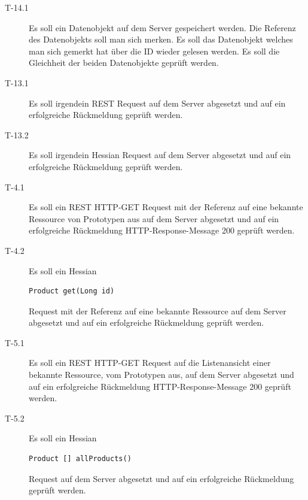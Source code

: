 \documentclass[abstracton, listof=totocnumbered,
bibliography=totocnumbered]{scrreprt}
\begin{document}
  \begin{description}

    \item[T-14.1] Es soll ein Datenobjekt auf dem Server gespeichert werden.
    Die Referenz des Datenobjekts soll man sich merken. Es soll das Datenobjekt
    welches man sich gemerkt hat über die ID wieder gelesen werden. Es soll die
    Gleichheit der beiden Datenobjekte geprüft werden.
    \newline

    \item[T-13.1] Es soll irgendein \ac{REST} Request auf dem Server abgesetzt
    und auf ein erfolgreiche Rückmeldung geprüft werden.
    \newline
    
    \item[T-13.2] Es soll irgendein Hessian Request auf dem Server abgesetzt
    und auf ein erfolgreiche Rückmeldung geprüft werden.
    \newline
    
    \item[T-4.1] Es soll ein \ac{REST} HTTP-GET Request mit der Referenz
    auf eine bekannte Ressource von Prototypen aus auf dem Server abgesetzt und
    auf ein erfolgreiche Rückmeldung HTTP-Response-Message 200 geprüft werden.
    \newline
    
    \item[T-4.2] Es soll ein Hessian 
    \begin{verbatim}Product get(Long id)\end{verbatim} 
    Request mit der Referenz auf eine bekannte Ressource auf dem Server
    abgesetzt und auf ein erfolgreiche Rückmeldung geprüft werden.
    \newline
    
    \item[T-5.1] Es soll ein \ac{REST} HTTP-GET Request auf die
    Listenansicht einer bekannte Ressource, vom Prototypen aus, auf dem Server
    abgesetzt und auf ein erfolgreiche Rückmeldung HTTP-Response-Message 200
    geprüft werden.
    \newline
    
    \item[T-5.2] Es soll ein Hessian 
    \begin{verbatim}Product [] allProducts()\end{verbatim}
    Request auf dem Server abgesetzt und auf ein erfolgreiche Rückmeldung
    geprüft werden.
    \newline
    

\end{description}
\end{document}
